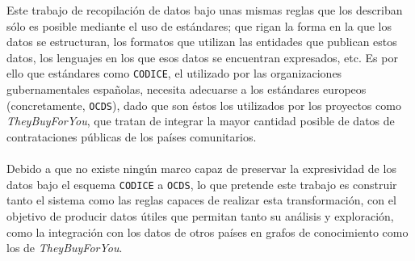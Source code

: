     Este trabajo de recopilación de datos bajo unas mismas reglas que los describan sólo es posible mediante el uso de estándares; que rigan la forma en la que los datos se estructuran, los formatos que utilizan las entidades que publican estos datos, los lenguajes en los que esos datos se encuentran expresados, etc. Es por ello que estándares como \texttt{CODICE}, el utilizado por las organizaciones gubernamentales españolas, necesita adecuarse a los estándares europeos (concretamente, \texttt{OCDS}), dado que son éstos los utilizados por los proyectos como \textit{TheyBuyForYou}, que tratan de integrar la mayor cantidad posible de datos de contrataciones públicas de los países comunitarios.
    \\ \\
    Debido a que no existe ningún marco capaz de preservar la expresividad de los datos bajo el esquema \texttt{CODICE} a \texttt{OCDS}, lo que pretende este trabajo es construir tanto el sistema como las reglas capaces de realizar esta transformación, con el objetivo de producir datos útiles que permitan tanto su análisis y exploración, como la integración con los datos de otros países en grafos de conocimiento como los de \textit{TheyBuyForYou}.
\newpage